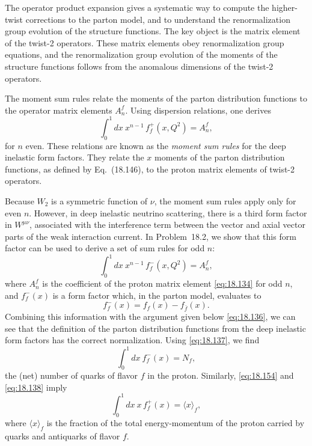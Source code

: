 The operator product expansion gives a systematic way to compute the
higher-twist corrections to the parton model, and to understand the
renormalization group evolution of the structure functions.  The key object
is the matrix element of the twist-2 operators.  These matrix elements obey
renormalization group equations, and the renormalization group evolution of
the moments of the structure functions follows from the anomalous dimensions
of the twist-2 operators.

The moment sum rules relate the moments of the parton distribution functions
to the operator matrix elements $A_n^f$.  Using dispersion relations, one
derives
\begin{equation}
  \int_0^1 dx\ x^{n-1}\,f_f^+(x, Q^2) = A_n^f ,
  \label{eq:18.154}
\end{equation}
for $n$ even.  These relations are known as the \emph{moment sum rules} for
the deep inelastic form factors.  They relate the $x$ moments of the parton
distribution functions, as defined by Eq.~(18.146), to the proton
matrix elements of twist-2 operators.

Because $W_2$ is a symmetric function of $\nu$, the moment sum rules apply
only for even $n$.  However, in deep inelastic neutrino scattering, there is
a third form factor in $W^{\mu\nu}$, associated with the interference term
between the vector and axial vector parts of the weak interaction current.
In Problem~18.2, we show that this form factor can be used to derive a set
of sum rules for odd $n$:
\begin{equation}
  \int_0^1 dx\ x^{n-1}\,f_f^-(x, Q^2) = A_n^f ,
  \label{eq:18.155}
\end{equation}
where $A_n^f$ is the coefficient of the proton matrix element
\eqref{eq:18.134} for odd $n$, and $f_f^-(x)$ is a form factor which, in the
parton model, evaluates to
\begin{equation}
  f_f^-(x) = f_f(x) - f_{\bar{f}}(x) .
  \label{eq:18.156}
\end{equation}
Combining this information with the argument given below \eqref{eq:18.136},
we can see that the definition of the parton distribution functions from the
deep inelastic form factors has the correct normalization.  Using
\eqref{eq:18.137}, we find
\begin{equation}
  \int_0^1 dx\ f_f^-(x) = N_f ,
  \label{eq:18.157}
\end{equation}
the (net) number of quarks of flavor $f$ in the proton.  Similarly,
\eqref{eq:18.154} and \eqref{eq:18.138} imply
\begin{equation}
  \int_0^1 dx\ x\,f_f^+(x) = \langle x\rangle_f ,
  \label{eq:18.158}
\end{equation}
where $\langle x\rangle_f$ is the fraction of the total energy-momentum of
the proton carried by quarks and antiquarks of flavor $f$.

